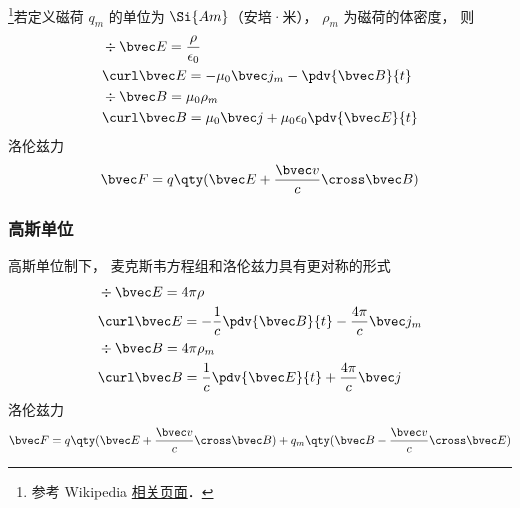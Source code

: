 
\begin{issues}
\issueDraft
\end{issues}


\footnote{参考 Wikipedia \href{https://en.wikipedia.org/wiki/Magnetic_monopole}{相关页面}．}若定义磁荷 $q_m$ 的单位为 $\Si{Am}$（安培·米）， $\rho_m$ 为磁荷的体密度， 则
\begin{equation}
\begin{aligned}
&\div \bvec E = \frac{\rho}{\epsilon_0}\\
&\curl \bvec E = - \mu_0 \bvec j_m -\pdv{\bvec B}{t}\\
&\div \bvec B = \mu_0 \rho_m \\
&\curl \bvec B = \mu_0 \bvec j + \mu_0\epsilon_0 \pdv{\bvec E}{t}
\end{aligned}
\end{equation}
洛伦兹力
\begin{equation}
\bvec F = q \qty(\bvec E + \frac{\bvec v}{c}\cross \bvec B)
\end{equation}

\subsubsection{高斯单位}
高斯单位制下， 麦克斯韦方程组和洛伦兹力具有更对称的形式
\begin{equation}\label{BMono_eq1}
\begin{aligned}
&\div \bvec E = 4\pi\rho\\
&\curl \bvec E = -\frac{1}{c}\pdv{\bvec B}{t}  - \frac{4\pi}{c}\bvec j_m\\
&\div \bvec B = 4\pi\rho_m \\
&\curl \bvec B = \frac{1}{c}\pdv{\bvec E}{t} + \frac{4\pi}{c} \bvec j
\end{aligned}
\end{equation}
洛伦兹力
\begin{equation}
\bvec F = q \qty(\bvec E + \frac{\bvec v}{c}\cross \bvec B) + q_m \qty(\bvec B - \frac{\bvec v}{c}\cross \bvec E)
\end{equation}
